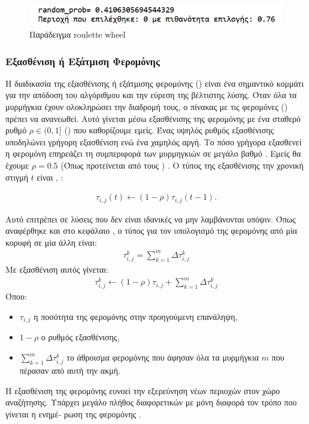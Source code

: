 \begin{figure}
    \centering
    \includegraphics[scale=0.9]{2947_thesis/pictures/roulette_wheel_example.png} 
    \caption{Παράδειγμα roulette wheel}
    \label{roulette}
\end{figure}

\subsubsection{Εξασθένιση ή Εξάτμιση Φερομόνης}

Η διαδικασία της εξασθένισης ή εξάτμισης φερομόνης () είναι ένα σημαντικό κομμάτι για την απόδοση του αλγόριθμου και την εύρεση της βέλτιστης λύσης. Όταν όλα τα μυρμήγκια έχουν ολοκληρώσει την διαδρομή τους, ο πίνακας με τις φερομόνες () πρέπει να ανανεωθεί. Αυτό γίνεται μέσω εξασθένισης της φερομόνης με ένα σταθερό ρυθμό $ρ \in (0,1]$ () που καθορίζουμε εμείς. Ένας υψηλός ρυθμός εξασθένισης υποδηλώνει γρήγορη εξασθένιση ενώ ένα χαμηλός αργή. Το πόσο γρήγορα εξασθενεί η φερομόνη επηρεάζει τη συμπεριφορά των μυρμηγκιών σε μεγάλο βαθμό \cite{dawson2013improving}. Εμείς θα έχουμε $ρ=0.5$ (Όπως προτείνεται από τους ) \cite{dorigo2003ant}. Ο τύπος της εξασθένισης την χρονική στιγμή $t$ είναι \cite{blum2005ant}, \cite{mpikou2013euretikoi}:

\begin{align}
	τ_{i,j}(t)\leftarrow(1-ρ)τ_{i,j}(t-1).
\end{align}

Αυτό επιτρέπει σε λύσεις που δεν είναι ιδανικές να μην λαμβάνονται υπόψιν. Όπως αναφέρθηκε και στο κεφάλαιο , ο τύπος για τον υπολογισμό της φερομόνης από μία κορυφή σε μία άλλη είναι: 
\begin{align}
    τ_{i,j}^k=\sum_{k=1}^{m}{Δτ^k_{i,j}}
\end{align}
Με εξασθένιση αυτός γίνεται: 
\begin{align}
    τ_{i,j}^k\leftarrow(1-ρ)τ_{i,j}+\sum_{k=1}^{m}{Δτ^k_{i,j}}
\end{align}
Όπου: 
\begin{itemize}
    \item $τ_{i,j}$ η ποσότητα της φερομόνης στην προηγούμενη επανάληψη,
    \item $1-ρ$ ο ρυθμός εξασθένισης,
    \item $\sum_{k=1}^{m}{Δτ^k_{i,j}}$ το άθροισμα φερομόνης που άφησαν όλα τα μυρμήγκια $m$ που πέρασαν από αυτή την ακμή.
\end{itemize}
Η εξασθένιση της φερομόνης ευνοεί την εξερεύνηση νέων περιοχών στον χώρο αναζήτησης. Υπάρχει μεγάλο πλήθος διαφορετικών  με μόνη διαφορά τον τρόπο που γίνεται η ενημέ- ρωση της φερομόνης \cite{mpikou2013euretikoi}.

